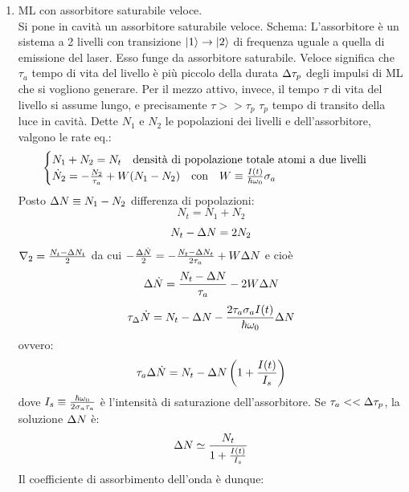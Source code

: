 \begin{enumerate}
\item ML con assorbitore saturabile veloce.\\
Si pone in cavità un assorbitore saturabile veloce.
Schema:
L'assorbitore è un sistema a 2 livelli con transizione $|1\rangle \rightarrow |2\rangle$ di frequenza uguale a quella di emissione del laser. Esso funge da assorbitore saturabile. Veloce significa che $\tau_a$ tempo di vita del livello  è più piccolo della durata $\Delta\tau_p$ degli impulsi di ML che si vogliono generare. Per il mezzo attivo, invece, il tempo $\tau$ di vita del livello  si assume lungo, e precisamente $\tau >> \tau_p$ $\tau_p$ tempo di transito della luce in cavità. Dette $N_1$ e $N_2$ le popolazioni dei livelli  e  dell'assorbitore, valgono le rate eq.:
\begin{equation*}
\begin{cases}
N_1 + N_2 = N_t \quad \text{densità di popolazione totale atomi a due livelli}\\
\dot{N}_2 = - \frac{N_2}{\tau_a} + W (N_1 - N_2) \quad \text{con} \quad W \equiv \frac{I(t)}{\hbar \omega_0} \sigma_a
\end{cases}
\end{equation*}
Posto $\Delta N \equiv N_1 -N_2$ differenza di popolazioni:
\begin{equation*}
N_t = N_1 + N_2
\end{equation*}
\begin{equation*}
N_t - \Delta N = 2N_2
\end{equation*}
$\nabla_2 = \frac{N_t - \Delta N_t}{2}$ da cui $-\frac{\Delta\dot{N}}{2} = -\frac{N_t - \Delta N_t}{2\tau_a} + W\Delta N$ e cioè
\begin{equation*}
\Delta\dot{N} = \frac{N_t - \Delta N}{\tau_a} - 2W\Delta N
\end{equation*}
\begin{equation*}
\tau_\Delta\dot{N} = N_t - \Delta N - \frac{2\tau_a \sigma_a I(t)}{\hbar \omega_0} \Delta N
\end{equation*}
ovvero:
\begin{equation*}
\tau_a \Delta \dot{N} = N_t - \Delta N \left(1 + \frac{I(t)}{I_s}\right)
\end{equation*}
dove $I_s \equiv \frac{\hbar\omega_0}{2\sigma_a\tau_a}$ è l'intensità di saturazione dell'assorbitore. Se $\tau_a << \Delta\tau_p$, la soluzione $\Delta N$ è:
\begin{equation*}
\Delta N \simeq \frac{N_t}{1 + \frac{I(t)}{I_s}}
\end{equation*}
Il coefficiente di assorbimento dell'onda è dunque:
\begin{equation*}

\end{equation*}
\end{enumerate}

